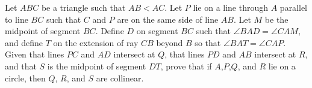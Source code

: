 Let $ABC$ be a triangle such that $AB < AC$. Let $P$ lie on a line through $A$ parallel to line $BC$ such that $C$ and $P$ are on the same side of line $AB$. Let $M$ be the midpoint of segment $BC$.  Define $D$ on segment $BC$ such that $\angle BAD = \angle CAM$, and define $T$ on the extension of ray $CB$ beyond $B$ so that $\angle BAT = \angle CAP$.  Given that lines $PC$ and $AD$ intersect at $Q$, that lines $PD$ and $AB$ intersect at $R$, and that $S$ is the midpoint of segment $DT$, prove that if $A$,$P$,$Q$, and $R$ lie on a circle, then $Q$, $R$, and $S$ are collinear.